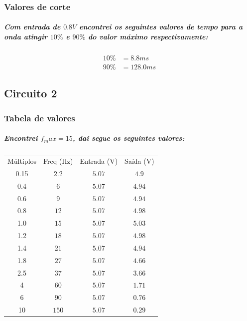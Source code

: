 \documentclass[12pt,twoside, a4paper, twocolumn]{article}
\begin{document}
\subsubsection{Valores de corte}


\subparagraph*{Com entrada de $0.8V$ encontrei os seguintes valores de tempo para a onda atingir $10\%$  e $90\%$ do valor máximo respectivamente:}


\begin{equation}
    \begin{aligned}
        10\% & = 8.8ms   \\
        90\% & = 128.0ms
    \end{aligned}
\end{equation}




\newpage


\subsection{Circuito 2}


\subsubsection{Tabela de valores}


\subparagraph*{Encontrei $f_max = 15$, daí segue os seguintes valores:}


\begin{center}
    \begin{tabular}{ |c|c|c|c| }
        \hline
        Múltiplos & Freq (Hz) & Entrada (V) & Saída (V) \\
        0.15      & $2.2$     & $5.07$      & $4.9$     \\
        0.4       & $6$       & $5.07$      & $4.94$    \\
        0.6       & $9$       & $5.07$      & $4.94$    \\
        0.8       & $12$      & $5.07$      & $4.98$    \\
        1.0       & $15$      & $5.07$      & $5.03$    \\
        1.2       & $18$      & $5.07$      & $4.98$    \\
        1.4       & $21$      & $5.07$      & $4.94$    \\
        1.8       & $27$      & $5.07$      & $4.66$    \\
        2.5       & $37$      & $5.07$      & $3.66$    \\
        4         & $60$      & $5.07$      & $1.71$    \\
        6         & $90$      & $5.07$      & $0.76$    \\
        10        & $150$     & $5.07$      & $0.29$    \\
        \hline
    \end{tabular}
\end{center}
\end{document}
